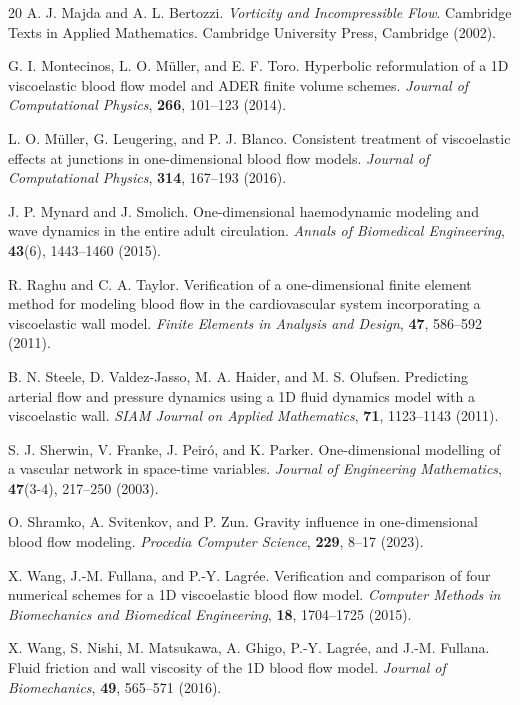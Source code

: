 \documentclass[reqno]{amsart}
\theoremstyle{definition}
\numberwithin{equation}{section}
\numberwithin{theorem}{section}
\numberwithin{definition}{section}
\begin{document}
\begin{thebibliography}{20}
A. J. Majda and A. L. Bertozzi.
\newblock \textit{Vorticity and Incompressible Flow}.
\newblock Cambridge Texts in Applied Mathematics. Cambridge University Press, Cambridge (2002).


G. I. Montecinos, L. O. Müller, and E. F. Toro.
\newblock Hyperbolic reformulation of a 1D viscoelastic blood flow model and ADER finite volume schemes.
\newblock \textit{Journal of Computational Physics}, \textbf{266}, 101--123 (2014).

L. O. Müller, G. Leugering, and P. J. Blanco.
\newblock Consistent treatment of viscoelastic effects at junctions in one-dimensional blood flow models.
\newblock \textit{Journal of Computational Physics}, \textbf{314}, 167--193 (2016).

J. P. Mynard and J. Smolich.
\newblock One-dimensional haemodynamic modeling and wave dynamics in the entire adult circulation.
\newblock \textit{Annals of Biomedical Engineering}, \textbf{43}(6), 1443--1460 (2015).



R. Raghu and C. A. Taylor.
\newblock Verification of a one-dimensional finite element method for modeling blood flow in the cardiovascular system incorporating a viscoelastic wall model.
\newblock \textit{Finite Elements in Analysis and Design}, \textbf{47}, 586--592 (2011).


B. N. Steele, D. Valdez-Jasso, M. A. Haider, and M. S. Olufsen.
\newblock Predicting arterial flow and pressure dynamics using a 1D fluid dynamics model with a viscoelastic wall.
\newblock \textit{SIAM Journal on Applied Mathematics}, \textbf{71}, 1123--1143 (2011).



S. J. Sherwin, V. Franke, J. Peiró, and K. Parker.
\newblock One-dimensional modelling of a vascular network in space-time variables.
\newblock \textit{Journal of Engineering Mathematics}, \textbf{47}(3-4), 217--250 (2003).


O. Shramko, A. Svitenkov, and P. Zun.
\newblock Gravity influence in one-dimensional blood flow modeling.
\newblock \textit{Procedia Computer Science}, \textbf{229}, 8--17 (2023).

X. Wang, J.-M. Fullana, and P.-Y. Lagrée.
\newblock Verification and comparison of four numerical schemes for a 1D viscoelastic blood flow model.
\newblock \textit{Computer Methods in Biomechanics and Biomedical Engineering}, \textbf{18}, 1704--1725 (2015).

X. Wang, S. Nishi, M. Matsukawa, A. Ghigo, P.-Y. Lagrée, and J.-M. Fullana.
\newblock Fluid friction and wall viscosity of the 1D blood flow model.
\newblock \textit{Journal of Biomechanics}, \textbf{49}, 565--571 (2016).

  
\end{thebibliography}


 
\end{document}
